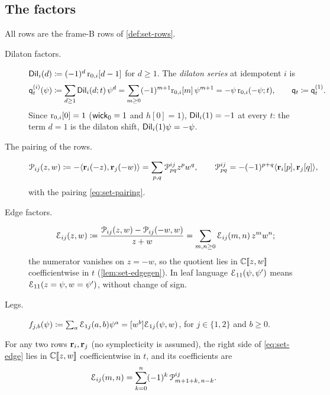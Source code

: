 \subsection{The factors}
\label{sec:set-factors}

\begin{defn}
\label{def:set-factors}
All rows are the frame-B rows of \cref{def:set-rows}.
\begin{description}
\item[Dilaton factors.] $\mathsf{Dil}_i(d)\coloneqq(-1)^d\,\mathrm{r}_{0,i}[d-1]$ for $d\geq1$. The \emph{dilaton series} at idempotent $i$ is
\[
\mathsf{q}_{t}^{(i)}(\psi)\coloneqq\sum_{d\geq1}\mathsf{Dil}_i(d;t)\,\psi^d=\sum_{m\geq0}(-1)^{m+1}\mathrm{r}_{0,i}[m]\,\psi^{m+1}=-\psi\,\mathrm{r}_{0,i}(-\psi;t),\qquad \mathsf{q}_{t}\coloneqq\mathsf{q}_{t}^{(1)} .
\]
Since $\mathrm{r}_{0,i}[0]=1$ ($\mathsf{wick}_0=1$ and $h[0]=1$), $\mathsf{Dil}_i(1)=-1$ at every $t$: the term $d=1$ is the dilaton shift, $\mathsf{Dil}_i(1)\psi=-\psi$.
\item[The pairing of the rows.]
\begin{equation}
\label{eq:set-Pij}
\mathcal{P}_{ij}(z,w)\coloneqq-\langle\mathbf{r}_i(-z),\mathbf{r}_j(-w)\rangle=\sum_{p,q}\mathcal{P}^{ij}_{pq}z^pw^q,\qquad \mathcal{P}^{ij}_{pq}=-(-1)^{p+q}\langle\mathbf{r}_i[p],\mathbf{r}_j[q]\rangle,
\end{equation}
with the pairing \eqref{eq:set-pairing}.
\item[Edge factors.]
\begin{equation}
\label{eq:set-edge}
\mathcal{E}_{ij}(z,w)\coloneqq\frac{\mathcal{P}_{ij}(z,w)-\mathcal{P}_{ij}(-w,w)}{z+w}=\sum_{m,n\geq0}\mathcal{E}_{ij}(m,n)\,z^mw^n ;
\end{equation}
the numerator vanishes on $z=-w$, so the quotient lies in $\mathbb{C}[\![ z,w ]\!]$ coefficientwise in $t$ (\cref{lem:set-edgegen}). In leaf language $\mathcal{E}_{11}(\psi,\psi')$ means $\mathcal{E}_{11}(z=\psi,w=\psi')$, without change of sign.
\item[Legs.] $f_{j,b}(\psi)\coloneqq\sum_a\mathcal{E}_{1j}(a,b)\psi^a=[w^b]\mathcal{E}_{1j}(\psi,w)$, for $j\in\{1,2\}$ and $b\geq0$.
\end{description}
\end{defn}

\begin{lem}
\label{lem:set-edgegen}
For any two rows $\mathbf{r}_i,\mathbf{r}_j$ (no symplecticity is assumed), the right side of \eqref{eq:set-edge} lies in $\mathbb{C}[\![ z,w ]\!]$ coefficientwise in $t$, and its coefficients are
\begin{equation}
\label{eq:set-EdN}
\mathcal{E}_{ij}(m,n)=\sum_{k=0}^{n}(-1)^k\,\mathcal{P}^{ij}_{m+1+k,\,n-k} .
\end{equation}
\end{lem}


